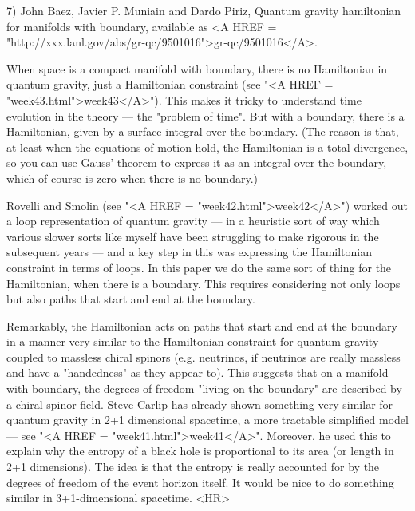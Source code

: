 7) John Baez, Javier P. Muniain and Dardo Piriz, Quantum gravity
hamiltonian for manifolds with boundary, available as <A HREF = "http://xxx.lanl.gov/abs/gr-qc/9501016">gr-qc/9501016</A>.

When space is a compact manifold with boundary, there is no Hamiltonian
in quantum gravity, just a Hamiltonian constraint (see "<A HREF = "week43.html">week43</A>").  This
makes it tricky to understand time evolution in the theory --- the "problem
of time".  But with a boundary, there is a Hamiltonian, given by a surface
integral over the boundary.  (The reason is that, at least when the equations
of motion hold, the Hamiltonian is a total divergence, so you can use
Gauss' theorem to express it as an integral over the boundary, which of
course is zero when there is no boundary.)  

Rovelli and Smolin (see "<A HREF = "week42.html">week42</A>") worked out a loop representation
of quantum gravity --- in a heuristic sort of way which various slower
sorts like myself have been struggling to make rigorous in the subsequent
years --- and a key step in this was expressing the Hamiltonian constraint
in terms of loops.  In this paper we do the same sort of thing for the
Hamiltonian, when there is a boundary.  This requires considering not
only loops but also paths that start and end at the boundary.  

Remarkably, the Hamiltonian acts on paths that start and end at the 
boundary in a manner very similar to the Hamiltonian constraint for 
quantum gravity coupled to massless chiral spinors (e.g. neutrinos, if 
neutrinos are really massless and have a "handedness" as they appear to).  
This suggests that on a manifold with boundary, the degrees of freedom 
"living on the boundary" are described by a chiral spinor field.  Steve Carlip 
has already shown something very similar for quantum gravity in 2+1
dimensional spacetime, a more tractable simplified model --- see "<A HREF = "week41.html">week41</A>".
Moreover, he used this to explain why the entropy of a black hole is 
proportional to its area (or length in 2+1 dimensions).  The idea is that 
the entropy is really accounted for by the degrees of freedom of the event 
horizon itself.  It would be nice to do something similar in 3+1-dimensional 
spacetime.
<HR>




